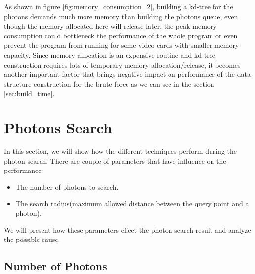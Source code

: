 As shown in figure \ref{fig:memory_consumption_2}, building a kd-tree for the photons demands much more memory than building the photons queue, even though the memory allocated here will release later, the peak memory consumption could bottleneck the performance of the whole program or even prevent the program from running for some video cards with smaller memory capacity. Since memory allocation is an expensive routine and kd-tree construction requires lots of temporary memory allocation/release, it becomes another important factor that brings negative impact on performance of the data structure construction for the brute force as we can see in the section \ref{sec:build_time}.

\section{Photons Search}

In this section, we will show how the different techniques perform during the photon search. There are couple of parameters that have influence on the performance:

\begin{itemize}

\item{The number of photons to search. }

\item{The search radius(maximum allowed distance between the query point and a photon). }

\end{itemize}

We will present how these parameters effect the photon search result and analyze the possible cause.

\subsection{Number of Photons}

